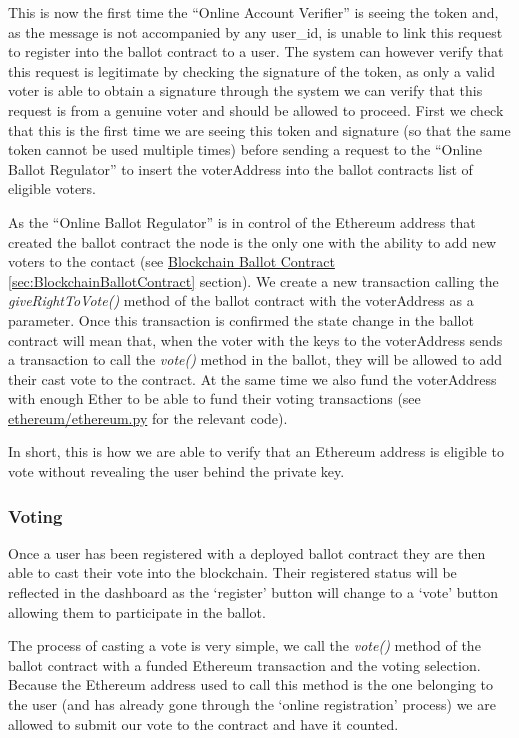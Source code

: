 \documentclass{article}
\begin{document}
This is now the first time the ``Online Account Verifier'' is seeing the token and, as the message is not accompanied by any user\_id, is unable to link this request to register into the ballot contract to a user. The system can however verify that this request is legitimate by checking the signature of the token, as only a valid voter is able to obtain a signature through the system we can verify that this request is from a genuine voter and should be allowed to proceed. First we check that this is the first time we are seeing this token and signature (so that the same token cannot be used multiple times) before sending a request to the ``Online Ballot Regulator'' to insert the voterAddress into the ballot contracts list of eligible voters.

As the ``Online Ballot Regulator'' is in control of the Ethereum address that created the ballot contract the node is the only one with the ability to add new voters to the contact (see \hyperref[sec:BlockchainBallotContract]{Blockchain Ballot Contract \ref*{sec:BlockchainBallotContract}} section). We create a new transaction calling the \textit{giveRightToVote()} method of the ballot contract with the voterAddress as a parameter. Once this transaction is confirmed the state change in the ballot contract will mean that, when the voter with the keys to the voterAddress sends a transaction to call the \textit{vote()} method in the ballot, they will be allowed to add their cast vote to the contract. At the same time we also fund the voterAddress with enough Ether to be able to fund their voting transactions (see \href{https://github.com/Mattie432/Blockchain-Voting-System/blob/master/Programming/4_OnlineBallotRegulator/ethereum/ethereum.py#L145}{ethereum/ethereum.py} for the relevant code).

In short, this is how we are able to verify that an Ethereum address is eligible to vote without revealing the user behind the private key.

\clearpage
\subsubsection{Voting}
Once a user has been registered with a deployed ballot contract they are then able to cast their vote into the blockchain. Their registered status will be reflected in the dashboard as the `register' button will change to a `vote' button allowing them to participate in the ballot.

The process of casting a vote is very simple, we call the \textit{vote()} method of the ballot contract with a funded Ethereum transaction and the voting selection. Because the Ethereum address used to call this method is the one belonging to the user (and has already gone through the `online registration' process) we are allowed to submit our vote to the contract and have it counted.
\end{document}
